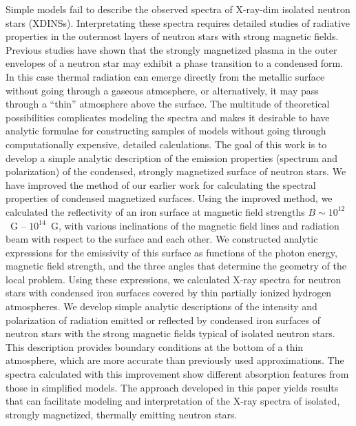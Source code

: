\documentclass{aa}
\begin{document}
\abstract
{Simple models fail to describe
the observed spectra of X-ray-dim isolated neutron
stars (XDINSs). Interpretating these spectra requires detailed
studies of radiative properties
in the outermost layers of neutron stars
with strong magnetic fields. Previous studies
have shown that the strongly magnetized plasma in the outer
envelopes of a neutron star may exhibit a phase transition
to a condensed form.
In this case thermal radiation can emerge directly from the
metallic surface without going through a gaseous
atmosphere, or alternatively, 
it may pass through a ``thin'' atmosphere
above the surface.
The multitude of theoretical possibilities
complicates modeling the spectra and
makes it desirable to have analytic formulae for 
constructing samples of models without going through 
computationally expensive, detailed calculations.
}{
The goal of this work is to 
develop a simple analytic description of 
the emission properties (spectrum and polarization)
of the condensed, strongly magnetized surface of neutron stars.
}{
We have improved the method of 
our earlier work
for calculating the spectral properties of condensed magnetized
surfaces. Using the improved method, we calculated the reflectivity
of an iron surface at magnetic field strengths
$B\sim10^{12}$~G -- $10^{14}$~G, with various inclinations of
the magnetic field lines and radiation beam with respect to
the surface and each other.
We constructed analytic expressions
for the emissivity
of this surface 
as functions of the photon energy,
magnetic field strength,
and the three angles that determine the geometry of the local
problem.
Using these expressions, we calculated X-ray
spectra for neutron stars with condensed iron surfaces covered
by thin partially ionized hydrogen atmospheres.
}{
We develop simple analytic descriptions of the intensity and polarization
of radiation emitted or reflected by 
condensed iron surfaces of neutron stars with the strong magnetic
fields typical of isolated neutron stars. This
description provides boundary conditions at the bottom of a
thin atmosphere, which are more accurate than previously used
approximations. The spectra calculated with this improvement
show different absorption features from those in simplified
models.
}{
The approach developed in this paper yields results that
can facilitate modeling and
interpretation of the X-ray spectra of isolated, strongly
magnetized, thermally emitting neutron stars.
}

\end{document}
